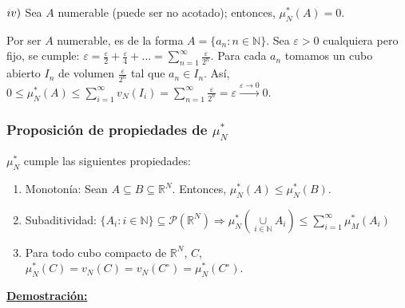 \documentclass[12pt,a4paper]{article}
\newcommand{\R}{\mathbb{R}}
\newcommand{\N}{\mathbb{N}}
\newcommand{\smallcup}{\mathop{\cup}\limits}
\newcommand{\smallsum}{\mathop{\sum}\limits}
\newcounter{unit}[section]
\newcounter{chapter}[unit]
\renewcommand{\theunit}{\arabic{unit}}
\renewcommand{\thechapter}{\arabic{chapter}}
\renewcommand{\thesubsubsection}{\theunit.\thechapter.\arabic{subsubsection}}
\newcommand{\result}[1]{%
  \subsubsection{#1}%
  \label{result:\thesubsubsection}
}
\newcommand{\dem}{
    \noindent \underline{\textbf{Demostración:}}
}
\begin{document}
\vspace{4mm} \noindent
$\romannumeral 4)$ Sea $A$ numerable (puede ser no acotado); entonces, $\mu^*_N(A) = 0$.
\begin{adjustwidth}{0.07\textwidth}{}
    Por ser $A$ numerable, es de la forma $A = \{a_n : n \in \N\}$.
    \newline Sea $\varepsilon > 0$ cualquiera pero fijo, se cumple: $\varepsilon = \frac{\varepsilon}{2} + \frac{\varepsilon}{4} + \ldots = \smallsum_{n=1}^{\infty}\frac{\varepsilon}{2^n}$.
    \newline Para cada $a_n$ tomamos un cubo abierto $I_n$ de volumen $\frac{\varepsilon}{2^n}$ tal que $a_n \in I_n$.
    \newline Así, $0 \leq \mu^*_N(A) \leq \smallsum_{i=1}^{\infty}v_N(I_i) = \smallsum_{n=1}^{\infty}\frac{\varepsilon}{2^n} = \varepsilon \xrightarrow{\varepsilon \to 0}0$.
\end{adjustwidth}

\newpage
\result{Proposición de propiedades de \texorpdfstring{$\mu^*_N$}{mu\^*\_N}}
\hspace{1mm} $\mu^*_N$ cumple las siguientes propiedades:
\begin{enumerate}[label=\roman*)]
    \item Monotonía: Sean $A \subseteq B \subseteq \R^N$. Entonces, $\mu^*_N(A) \leq \mu^*_N(B)$.
    \item Subaditividad: $\{A_i : i \in \N\} \subseteq \mathcal{P}(\R^N) \Rightarrow \mu^*_N(\smallcup_{i\in\N}A_i) \leq \smallsum_{i=1}^{\infty}\mu^*_M(A_i)$
    \item Para todo cubo compacto de $\R^N$, $C$, $\mu^*_N(C) = v_N(C) = v_N(C^\circ) = \mu^*_N(C^\circ)$.
\end{enumerate}

\vspace{3mm} \dem
\end{document}
